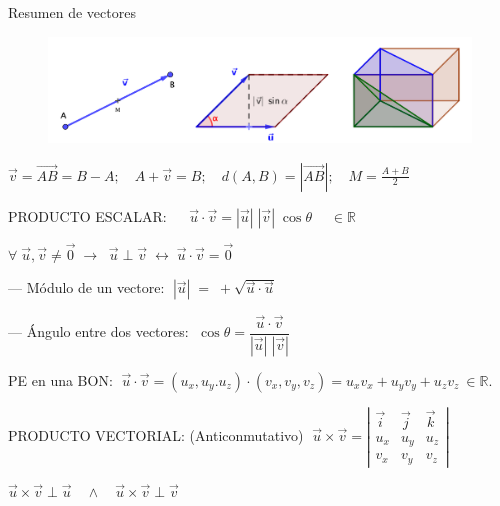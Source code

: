 \begin{myalertblock}{Resumen de vectores}

\begin{figure}[H]
	\centering
	\includegraphics[width=.95\textwidth]{imagenes/imagenes09/T09IM30.png}
\end{figure}

$\vec v=\overrightarrow{AB}=B-A; \quad A+\vec v=B;\quad d(A,B)=|\overrightarrow{AB}|;\quad M=\frac {A+B}{2}$

\vspace{3mm} PRODUCTO ESCALAR: $\quad \boxed{\;\vec u\cdot \vec v= |\vec u|\;|\vec v|\; \cos \theta\;} \quad \in \mathbb R$

\vspace{1mm} \hspace{10mm} $\forall \; \vec u , \vec v \neq \vec 0 \;\longrightarrow \;\; \vec u \;\bot\; \vec v \;\leftrightarrow\; \vec u \cdot \vec v = \vec 0$

\vspace{1mm} \hspace{10mm} --- Módulo de un vectore: $\;|\vec u|\;=\; +\sqrt{\vec u \cdot \vec u}$

\vspace{1mm} \hspace{10mm} --- Ángulo entre dos vectores: $\; \cos \theta=\dfrac{\vec u \cdot \vec v}{|\vec u|\;|\vec v|}$

\vspace{1mm}  \footnotesize{PE en una BON:  $\; \vec u \cdot \vec v=(u_x,u_y.u_z) \cdot (v_x,v_y,v_z)=u_xv_x+u_yv_y+u_zv_z\ \in \mathbb R$}\normalsize{.}

\vspace{3mm} PRODUCTO VECTORIAL: \tiny{(Anticonmutativo)} \normalsize{$\; \vec u \times \vec v = \left| \begin{matrix} \vec i& \vec j& \vec k\\ u_x&u_y&u_z\\v_x&v_y&v_z\end{matrix} \right|$}

\vspace{1mm} \hspace{10mm} $\vec u \times \vec v \; \bot \; \vec u \quad \wedge \quad  \vec u \times \vec v \; \bot \; \vec v $


\end{myalertblock}
